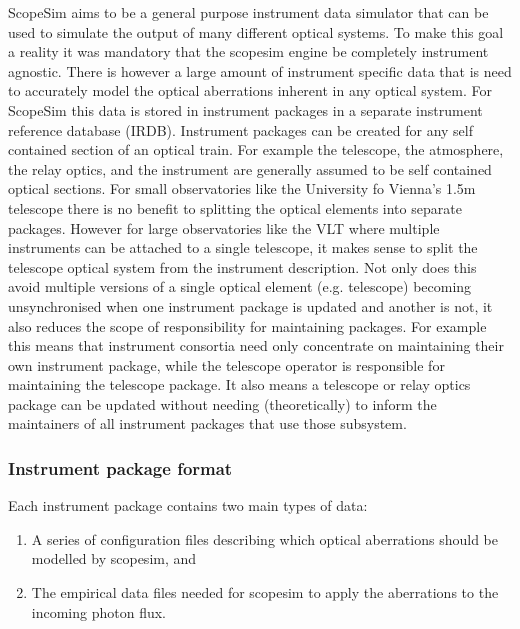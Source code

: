 ScopeSim aims to be a general purpose instrument data simulator that can be used to simulate the output of many different optical systems.
To make this goal a reality it was mandatory that the scopesim engine be completely instrument agnostic.
There is however a large amount of instrument specific data that is need to accurately model the optical aberrations inherent in any optical system.
For ScopeSim this data is stored in instrument packages in a separate instrument reference database (IRDB).
Instrument packages can be created for any self contained section of an optical train.
For example the telescope, the atmosphere, the relay optics, and the instrument are generally assumed to be self contained optical sections.
For small observatories like the University fo Vienna's 1.5m telescope there is no benefit to splitting the optical elements into separate packages.
However for large observatories like the VLT where multiple instruments can be attached to a single telescope, it makes sense to split the telescope optical system from the instrument description.
Not only does this avoid multiple versions of a single optical element (e.g. telescope) becoming unsynchronised when one instrument package is updated and another is not, it also reduces the scope of responsibility for maintaining packages.
For example this means that instrument consortia need only concentrate on maintaining their own instrument package, while the telescope operator is responsible for maintaining the telescope package.
It also means a telescope or relay optics package can be updated without needing (theoretically) to inform the maintainers of all instrument packages that use those subsystem.


\subsubsection{Instrument package format%
  \label{instrument-package-format}%
}

Each instrument package contains two main types of data:

\begin{enumerate}
\item A series of configuration files describing which optical aberrations should be modelled by scopesim, and

\item The empirical data files needed for scopesim to apply the aberrations to the incoming photon flux.
\end{enumerate}

